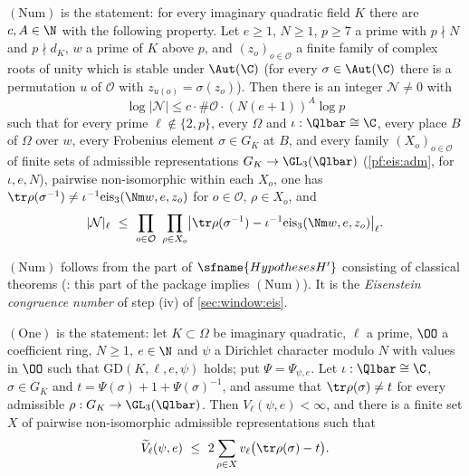 \begin{definition}\label{pf:eis:number}
$(\mathrm{Num})$ is the statement: for every imaginary quadratic field $K$ there are $c,A\in\N$ with the following
property. Let $e\ge1$, $N\ge1$, $p\ge7$ a prime with $p\nmid N$ and $p\nmid d_K$, $w$ a prime of $K$ above $p$, and
$(z_o)_{o\in\mathcal O}$ a finite family of complex roots of unity which is stable under $\Aut(\C)$ (for every
$\sigma\in\Aut(\C)$ there is a permutation $u$ of $\mathcal O$ with $z_{u(o)}=\sigma(z_o)$). Then there is an integer
$\mathcal N\ne0$ with
\[
 \log|\mathcal N|\le c\cdot\#\mathcal O\cdot(N(e+1))^A\log p
\]
such that for every prime $\ell\notin\{2,p\}$, every $\Omega$ and $\iota:\Qlbar\cong\C$, every place $B$ of $\Omega$ over $w$, every
Frobenius element $\sigma\in G_K$ at $B$, and every family $(X_o)_{o\in\mathcal O}$ of finite sets of admissible
representations $G_K\to\GL_3(\Qlbar)$ (\cref{pf:eis:adm}, for $\iota,e,N$), pairwise non-isomorphic within each
$X_o$, one has $\tr\rho(\sigma^{-1})\ne\iota^{-1}\eiseis_3(\Nm w,e,z_o)$ for $o\in\mathcal O$, $\rho\in X_o$, and
\[
 |\mathcal N|_\ell\ \le\ \prod_{o\in\mathcal O}\ \prod_{\rho\in X_o}\bigl|\tr\rho(\sigma^{-1})-\iota^{-1}\eiseis_3(\Nm w,e,z_o)\bigr|_\ell .
\]
\end{definition}

$(\mathrm{Num})$ follows from the part of $\sfname{HypothesesH'}$ consisting of classical theorems
(: this part of the package implies $(\mathrm{Num})$). It is the
\emph{Eisenstein congruence number} of step (iv) of \cref{sec:window:eis}.

\begin{definition}\label{pf:eis:onecharstmt}
$(\mathrm{One})$ is the statement: let $K\subset\Omega$ be imaginary quadratic, $\ell$ a prime, $\OO$ a coefficient ring,
$N\ge1$, $e\in\N$ and $\psi$ a Dirichlet character modulo $N$ with values in $\OO$ such that $\mathrm{GD}(K,\ell,e,\psi)$
holds; put $\Psi=\Psi_{\psi,e}$. Let $\iota:\Qlbar\cong\C$, $\sigma\in G_K$ and $t=\Psi(\sigma)+1+\Psi(\sigma)^{-1}$, and assume
that $\tr\rho(\sigma)\ne t$ for every admissible $\rho:G_K\to\GL_3(\Qlbar)$. Then $V_\ell(\psi,e)<\infty$, and there is a
finite set $X$ of pairwise non-isomorphic admissible representations such that
\[
 \eisVt_\ell(\psi,e)\ \le\ 2\sum_{\rho\in X}\eisv\bigl(\tr\rho(\sigma)-t\bigr).
\]
\end{definition}

